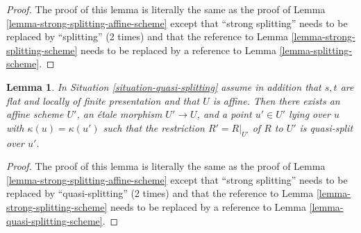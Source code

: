 \documentclass{stacks-project}
\theoremstyle{plain}
\newtheorem{lemma}[subsection]{Lemma}
\theoremstyle{definition}
\theoremstyle{remark}
\numberwithin{equation}{subsection}
\begin{document}
\begin{proof}
The proof of this lemma is literally the same as the proof of
Lemma \ref{lemma-strong-splitting-affine-scheme}
except that ``strong splitting'' needs to be replaced by ``splitting''
(2 times) and that the reference to
Lemma \ref{lemma-strong-splitting-scheme}
needs to be replaced by a reference to
Lemma \ref{lemma-splitting-scheme}.
\end{proof}

\begin{lemma}
\label{lemma-quasi-splitting-affine-scheme}
In Situation \ref{situation-quasi-splitting} assume in addition that
$s, t$ are flat and locally of finite presentation and that $U$ is affine.
Then there exists an affine scheme $U'$, an \'etale morphism
$U' \to U$, and a point $u' \in U'$ lying over $u$ with
$\kappa(u) = \kappa(u')$ such that the restriction $R' = R|_{U'}$ of
$R$ to $U'$ is quasi-split over $u'$.
\end{lemma}

\begin{proof}
The proof of this lemma is literally the same as the proof of
Lemma \ref{lemma-strong-splitting-affine-scheme}
except that ``strong splitting'' needs to be replaced by ``quasi-splitting''
(2 times) and that the reference to
Lemma \ref{lemma-strong-splitting-scheme}
needs to be replaced by a reference to
Lemma \ref{lemma-quasi-splitting-scheme}.
\end{proof}






\end{document}
